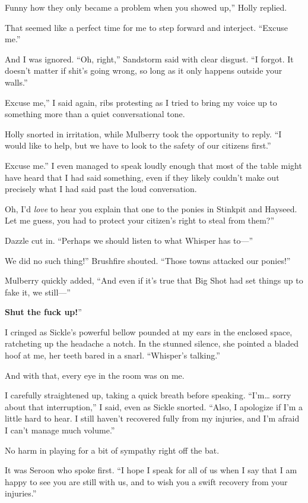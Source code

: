 \leavevmode{}Funny how they only became a problem when you showed up,” Holly replied.

That seemed like a perfect time for me to step forward and interject. “Excuse me.”

And I was ignored. “Oh, right,” Sandstorm said with clear disgust. “I forgot. It doesn’t matter if shit’s going wrong, so long as it only happens outside your walls.”

\leavevmode{}Excuse me,” I said again, ribs protesting as I tried to bring my voice up to something more than a quiet conversational tone.

Holly snorted in irritation, while Mulberry took the opportunity to reply. “I would like to help, but we have to look to the safety of our citizens first.”

\leavevmode{}Excuse me.” I even managed to speak loudly enough that most of the table might have heard that I had said something, even if they likely couldn’t make out precisely what I had said past the loud conversation.

\leavevmode{}Oh, I’d \textit{love} to hear you explain that one to the ponies in Stinkpit and Hayseed. Let me guess, you had to protect your citizen’s right to steal from them?”

Dazzle cut in. “Perhaps we should listen to what Whisper has to—”

\leavevmode{}We did no such thing!” Brushfire shouted. “Those towns attacked our ponies!”

Mulberry quickly added, “And even if it’s true that Big Shot had set things up to fake it, we still—”

\leavevmode{}\textbf{Shut the fuck up!}”

I cringed as Sickle’s powerful bellow pounded at my ears in the enclosed space, ratcheting up the headache a notch. In the stunned silence, she pointed a bladed hoof at me, her teeth bared in a snarl. “Whisper’s talking.”

And with that, every eye in the room was on me.

I carefully straightened up, taking a quick breath before speaking. “I’m… sorry about that interruption,” I said, even as Sickle snorted. “Also, I apologize if I’m a little hard to hear. I still haven’t recovered fully from my injuries, and I’m afraid I can’t manage much volume.”

No harm in playing for a bit of sympathy right off the bat.

It was Seroon who spoke first. “I hope I speak for all of us when I say that I am happy to see you are still with us, and to wish you a swift recovery from your injuries.”

